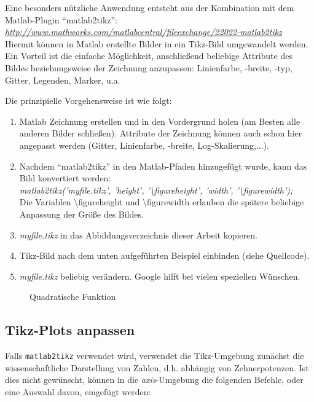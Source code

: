 Eine besonders nützliche Anwendung entsteht aus der Kombination mit dem Matlab-Plugin "`matlab2tikz"':\\
\href{http://www.mathworks.com/matlabcentral/fileexchange/22022-matlab2tikz}{\emph{http://www.mathworks.com/matlabcentral/fileexchange/22022-matlab2tikz}}\\
Hiermit können in Matlab erstellte Bilder in ein Tikz-Bild umgewandelt werden. Ein Vorteil ist die einfache Möglichkeit, anschließend beliebige Attribute des Bildes beziehungsweise der Zeichnung anzupassen: Linienfarbe, -breite, -typ, Gitter, Legenden, Marker, u.a.

Die prinzipielle Vorgehensweise ist wie folgt:
\begin{enumerate}
	\item Matlab Zeichnung erstellen und in den Vordergrund holen (am Besten alle anderen Bilder schließen).
		Attribute der Zeichnung können auch schon hier angepasst werden (Gitter, Linienfarbe, -breite, Log-Skalierung,...).
	\item Nachdem "`matlab2tikz"' in den Matlab-Pfaden hinzugefügt wurde, kann das Bild konvertiert werden:\\
		\textit{matlab2tikz('myfile.tikz', 'height', '\textbackslash figureheight', 'width', '\textbackslash figurewidth');} \\
		Die Variablen \textbackslash figureheight und \textbackslash figurewidth erlauben die spätere beliebige Anpassung der Größe des Bildes.
	\item \textit{myfile.tikz} in das Abbildungsverzeichnis dieser Arbeit kopieren.
	\item Tikz-Bild nach dem unten aufgeführten Beispiel einbinden (siehe Quellcode).
	\item \textit{myfile.tikz} beliebig verändern. Google hilft bei vielen speziellen Wünschen. 
\end{enumerate}


\begin{figure}[h]
\centering
{} %
\caption{Quadratische Funktion}
\label{fig:tikz:x_square}
\end{figure}


\subsection{Tikz-Plots anpassen}

Falls \texttt{matlab2tikz} verwendet wird, verwendet die Tikz-Umgebung zunächst die wissenschaftliche Darstellung von Zahlen, d.h. abhängig von Zehnerpotenzen.
Ist dies nicht gewünscht, können in die \textit{axis}-Umgebung die folgenden Befehle, oder eine Auswahl davon, eingefügt werden:

